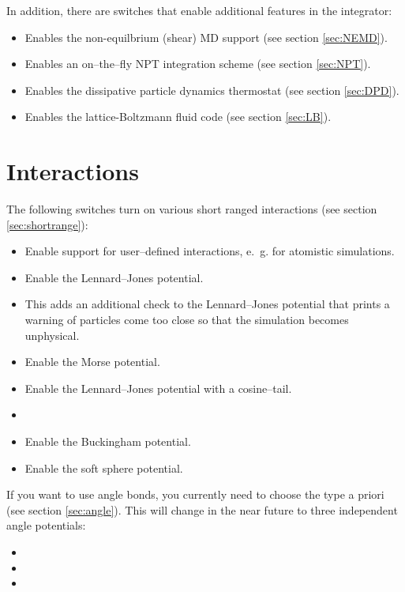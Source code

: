 In addition, there are switches that enable additional features in the integrator:
\begin{itemize}
\item {} Enables the non-equilbrium (shear) MD support
  (see section \vref{sec:NEMD}).
\item {} Enables an on--the--fly NPT integration scheme
  (see section \vref{sec:NPT}).
\item {} Enables the dissipative particle dynamics
  thermostat (see section \vref{sec:DPD}).
\item {} Enables the lattice-Boltzmann fluid code (see
  section \vref{sec:LB}).
\end{itemize}

\section{Interactions}

The following switches turn on various short ranged interactions (see section
\vref{sec:shortrange}):
\begin{itemize}
\item {} Enable support for user--defined
  interactions, e.~g. for atomistic simulations.
\item {} Enable the Lennard--Jones potential.
\item {} This adds an additional check to
  the Lennard--Jones potential that prints a warning of particles come
  too close so that the simulation becomes unphysical.
\item {} Enable the Morse potential.
\item {} Enable the Lennard--Jones potential with a cosine--tail.
\item {}
\item {} Enable the Buckingham potential.
\item {} Enable the soft sphere potential.
\end{itemize}

If you want to use angle bonds, you currently need to choose the type
a priori (see section \vref{sec:angle}). This will change in the near
future to three independent angle potentials:
\begin{itemize}
\item {}
\item {}
\item {}
\end{itemize}

